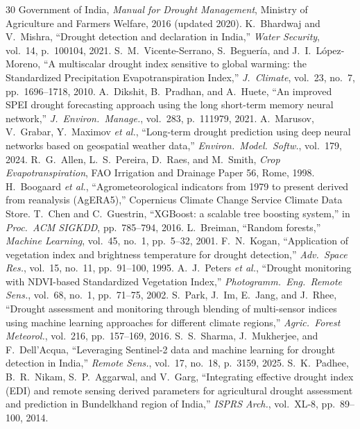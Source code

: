 \documentclass[11pt,a4paper,oneside]{article}
\begin{document}
\begin{thebibliography}{30}
\setlength{\itemsep}{0pt}
\setlength{\parsep}{0pt}
 Government of India, \textit{Manual for Drought Management}, Ministry of Agriculture and Farmers Welfare, 2016 (updated 2020).
 K.~Bhardwaj and V.~Mishra, ``Drought detection and declaration in India,'' \textit{Water Security}, vol.~14, p.~100104, 2021.
 S.~M.~Vicente-Serrano, S.~Beguer\'{i}a, and J.~I.~L\'{o}pez-Moreno, ``A multiscalar drought index sensitive to global warming: the Standardized Precipitation Evapotranspiration Index,'' \textit{J.\ Climate}, vol.~23, no.~7, pp.~1696--1718, 2010.
 A.~Dikshit, B.~Pradhan, and A.~Huete, ``An improved SPEI drought forecasting approach using the long short-term memory neural network,'' \textit{J.\ Environ.\ Manage.}, vol.~283, p.~111979, 2021.
 A.~Marusov, V.~Grabar, Y.~Maximov \textit{et al.}, ``Long-term drought prediction using deep neural networks based on geospatial weather data,'' \textit{Environ.\ Model.\ Softw.}, vol.~179, 2024.
 R.~G.~Allen, L.~S.~Pereira, D.~Raes, and M.~Smith, \textit{Crop Evapotranspiration}, FAO Irrigation and Drainage Paper 56, Rome, 1998.
 H.~Boogaard \textit{et al.}, ``Agrometeorological indicators from 1979 to present derived from reanalysis (AgERA5),'' Copernicus Climate Change Service Climate Data Store.
 T.~Chen and C.~Guestrin, ``XGBoost: a scalable tree boosting system,'' in \textit{Proc.\ ACM SIGKDD}, pp.~785--794, 2016.
 L.~Breiman, ``Random forests,'' \textit{Machine Learning}, vol.~45, no.~1, pp.~5--32, 2001.
 F.~N.~Kogan, ``Application of vegetation index and brightness temperature for drought detection,'' \textit{Adv.\ Space Res.}, vol.~15, no.~11, pp.~91--100, 1995.
 A.~J.~Peters \textit{et al.}, ``Drought monitoring with NDVI-based Standardized Vegetation Index,'' \textit{Photogramm.\ Eng.\ Remote Sens.}, vol.~68, no.~1, pp.~71--75, 2002.
 S.~Park, J.~Im, E.~Jang, and J.~Rhee, ``Drought assessment and monitoring through blending of multi-sensor indices using machine learning approaches for different climate regions,'' \textit{Agric.\ Forest Meteorol.}, vol.~216, pp.~157--169, 2016.
 S.~S.~Sharma, J.~Mukherjee, and F.~Dell'Acqua, ``Leveraging Sentinel-2 data and machine learning for drought detection in India,'' \textit{Remote Sens.}, vol.~17, no.~18, p.~3159, 2025.
 S.~K.~Padhee, B.~R.~Nikam, S.~P.~Aggarwal, and V.~Garg, ``Integrating effective drought index (EDI) and remote sensing derived parameters for agricultural drought assessment and prediction in Bundelkhand region of India,'' \textit{ISPRS Arch.}, vol.~XL-8, pp.~89--100, 2014.

\end{thebibliography}
\end{document}
